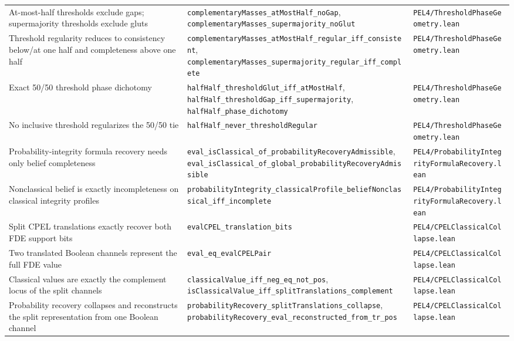 \begin{longtable}{@{}p{}p{}p{}@{}}
\addlinespace
At-most-half thresholds exclude gaps; supermajority thresholds exclude gluts & \texttt{complementaryMasses\_atMostHalf\_noGap}, \texttt{complementaryMasses\_supermajority\_noGlut} & \texttt{PEL4/ThresholdPhaseGeometry.lean}\\
\addlinespace
Threshold regularity reduces to consistency below/at one half and completeness above one half & \texttt{complementaryMasses\_atMostHalf\_regular\_iff\_consistent}, \texttt{complementaryMasses\_supermajority\_regular\_iff\_complete} & \texttt{PEL4/ThresholdPhaseGeometry.lean}\\
\addlinespace
Exact 50/50 threshold phase dichotomy & \texttt{halfHalf\_thresholdGlut\_iff\_atMostHalf}, \texttt{halfHalf\_thresholdGap\_iff\_supermajority}, \texttt{halfHalf\_phase\_dichotomy} & \texttt{PEL4/ThresholdPhaseGeometry.lean}\\
\addlinespace
No inclusive threshold regularizes the 50/50 tie & \texttt{halfHalf\_never\_thresholdRegular} & \texttt{PEL4/ThresholdPhaseGeometry.lean}\\
\addlinespace
Probability-integrity formula recovery needs only belief completeness & \texttt{eval\_isClassical\_of\_probabilityRecoveryAdmissible}, \texttt{eval\_isClassical\_of\_global\_probabilityRecoveryAdmissible} & \texttt{PEL4/ProbabilityIntegrityFormulaRecovery.lean}\\
\addlinespace
Nonclassical belief is exactly incompleteness on classical integrity profiles & \texttt{probabilityIntegrity\_classicalProfile\_beliefNonclassical\_iff\_incomplete} & \texttt{PEL4/ProbabilityIntegrityFormulaRecovery.lean}\\
\addlinespace
Split CPEL translations exactly recover both FDE support bits & \texttt{evalCPEL\_translation\_bits} & \texttt{PEL4/CPELClassicalCollapse.lean}\\
\addlinespace
Two translated Boolean channels represent the full FDE value & \texttt{eval\_eq\_evalCPELPair} & \texttt{PEL4/CPELClassicalCollapse.lean}\\
\addlinespace
Classical values are exactly the complement locus of the split channels & \texttt{classicalValue\_iff\_neg\_eq\_not\_pos}, \texttt{isClassicalValue\_iff\_splitTranslations\_complement} & \texttt{PEL4/CPELClassicalCollapse.lean}\\
\addlinespace
Probability recovery collapses and reconstructs the split representation from one Boolean channel & \texttt{probabilityRecovery\_splitTranslations\_collapse}, \texttt{probabilityRecovery\_eval\_reconstructed\_from\_tr\_pos} & \texttt{PEL4/CPELClassicalCollapse.lean}\\

\end{longtable}
